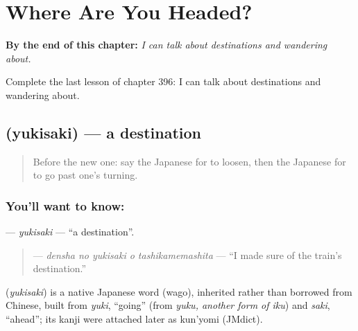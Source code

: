 
\chapter{Where Are You Headed?}
\label{ch:ja-where-are-you-headed}

\begin{chapteropening}
\textbf{By the end of this chapter:} \emph{I can talk about destinations and wandering about.}

Complete the last lesson of chapter 396: I can talk about destinations and wandering about.
\end{chapteropening}

\section[\texorpdfstring{\ja{ゆきさき} (yukisaki)}{ゆきさき (yukisaki)}]{ (yukisaki) — a destination}

\label{lesson:JA-C396-yukisaki}



\begin{quote}
Before the new one: say the Japanese for to loosen, then the Japanese for to go past one's turning.
\end{quote}

\subsection*{You'll want to know: }
\textbf{} — \emph{yukisaki} — \textquotedblleft{}a destination\textquotedblright{}.

\begin{quote}
\textbf{  } — \emph{densha no yukisaki o tashikamemashita} — \textquotedblleft{}I made sure of the train's destination.\textquotedblright{}
\end{quote}

\begin{cousinweb}
\textbf{} (\emph{yukisaki}) is a native Japanese word (wago), inherited rather than borrowed from Chinese, built from \emph{yuki}, \textquotedblleft{}going\textquotedblright{} (from \emph{yuku, another form of iku}) and \emph{saki}, \textquotedblleft{}ahead\textquotedblright{}; its kanji were attached later as kun'yomi (JMdict).
\end{cousinweb}

